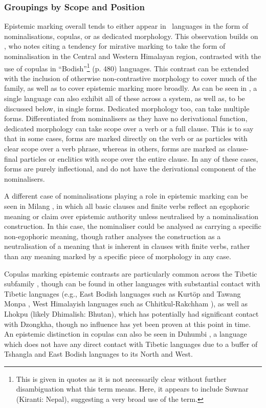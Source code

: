 \subsubsection{Groupings by Scope and Position}\label{sss:Description:ScopePosition}
Epistemic marking overall tends to either appear in \lfam\ languages in the form of nominalisations, copulas, or as dedicated morphology. This observation builds on , who notes citing  a tendency for mirative marking to take the form of nominalisation in the Central and Western Himalayan region, contrasted with the use of copulas in ``Bodish''\footnote{This is given in quotes as it is not necessarily clear without further disambiguation what this term means. Here, it appears to include Suwnar (Kiranti: Nepal), suggesting a very broad use of the term.} (p. 480) languages. This contrast can be extended with the inclusion of otherwise non-contrastive morphology to cover much of the family, as well as to cover epistemic marking more broadly. As can be seen in , a single language can also exhibit all of these across a system, as well as, to be discussed below, in single forms. Dedicated morphology too, can take multiple forms. Differentiated from nominalisers as they have no derivational function, dedicated morphology can take scope over a verb or a full clause. This is to say that in some cases, forms are marked directly on the verb or as particles with clear scope over a verb phrase, whereas in others, forms are marked as clause-final particles or enclitics with scope over the entire clause. In any of these cases, forms are purely inflectional, and do not have the derivational component of the nominalisers.

A different case of nominalisations playing a role in epistemic marking can be seen in Milang \cite[Siangic: India,][]{Modi2017}, in which all basic clauses and finite verbs reflect an egophoric meaning or claim over epistemic authority unless neutralised by a nominalisation construction. In this case, the nominaliser could be analysed as carrying a specific non-egophoric meaning, though  rather analyses the construction as a neutralisation of a meaning that is inherent in clauses with finite verbs, rather than any meaning marked by a specific piece of morphology in any case.

Copulas marking epistemic contrasts are particularly common across the Tibetic subfamily \cite{Zemp2020}, though can be found in other languages with substantial contact with Tibetic languages (e.g., East Bodish languages such as Kurtöp \cite{Hyslop2020Kurtop} and Tawang Monpa \cite{Tombleson2020}, West Himalayish languages such as Chhitkul-Rakchham \cite{Martinez2021}), as well as Lhokpu (likely Dhimalish: Bhutan), which has potentially had significant contact with Dzongkha, though no influence has yet been proven at this point in time. An epistemic distinction in copulas can also be seen in Duhumbi \cite[Duhumbi: Kho-Bwa,][]{Bodt2020}, a language which does not have any direct contact with Tibetic languages due to a buffer of Tshangla and East Bodish languages to its North and West.

